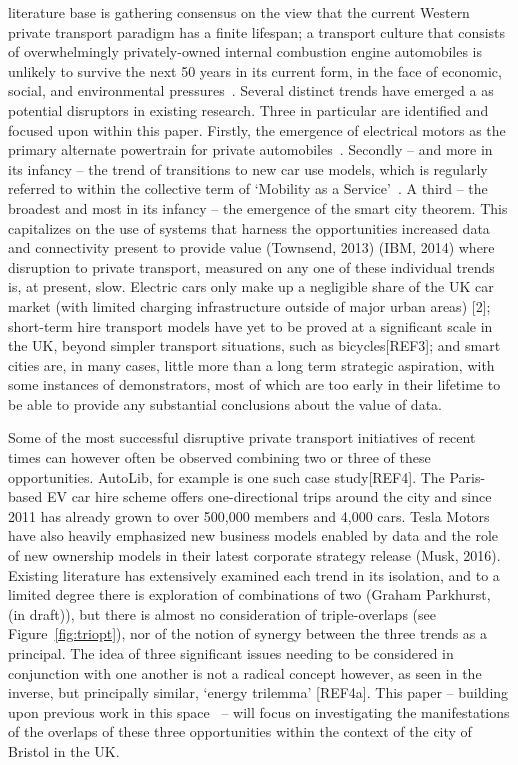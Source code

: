 \documentclass[journal]{IEEEtran}
\begin{document}
 literature base is gathering consensus on
the view that the current Western private transport paradigm has a
finite lifespan; a transport culture that consists of overwhelmingly
privately-owned internal combustion engine automobiles is unlikely to
survive the next 50 years in its current form, in the face of
economic, social, and environmental
pressures~\cite{lerner:2011,parkhurst:2011,van-audenhove-et-al:2014,black-et-al:2016}.
Several distinct trends have emerged a as potential disruptors in
existing research. Three in particular are identified and focused upon
within this paper.  Firstly, the emergence of electrical motors as the
primary alternate powertrain for private
automobiles~\cite{paffumi-et-al:2015,gnann-et-al:2015}.  Secondly --
and more in its infancy -- the trend of transitions to new car use
models, which is regularly referred to within the collective term of
`Mobility as a Service'~\cite{tscatapult:2016}. A third -- the
broadest and most in its infancy -- the emergence of the smart city
theorem. This capitalizes on the use of systems that harness the
opportunities increased data and connectivity present to provide value
(Townsend, 2013) (IBM, 2014) where disruption to private transport,
measured on any one of these individual trends is, at present,
slow. Electric cars only make up a negligible share of the UK car
market (with limited charging infrastructure outside of major urban
areas) [2]; short-term hire transport models have yet to be proved at
a significant scale in the UK, beyond simpler transport situations,
such as bicycles[REF3]; and smart cities are, in many cases, little
more than a long term strategic aspiration, with some instances of
demonstrators, most of which are too early in their lifetime to be
able to provide any substantial conclusions about the value of data.

Some of the most successful disruptive private transport initiatives
of recent times can however often be observed combining two or three
of these opportunities. AutoLib, for example is one such case
study[REF4]. The Paris-based EV car hire scheme offers one-directional
trips around the city and since 2011 has already grown to over 500,000
members and 4,000 cars. Tesla Motors have also heavily emphasized new
business models enabled by data and the role of new ownership models
in their latest corporate strategy release (Musk, 2016). Existing
literature has extensively examined each trend in its isolation, and
to a limited degree there is exploration of combinations of two
(Graham Parkhurst, (in draft)), but there is almost no consideration
of triple-overlaps (see Figure~\ref{fig:triopt}), nor of the notion of
synergy between the three trends as a principal. The idea of three
significant issues needing to be considered in conjunction with one
another is not a radical concept however, as seen in the inverse, but
principally similar, `energy trilemma' [REF4a].  This paper --
building upon previous work in this
space~\cite{cooper-et-al-sose:2015} -- will focus on investigating the
manifestations of the overlaps of these three opportunities within the
context of the city of Bristol in the UK.
\end{document}
